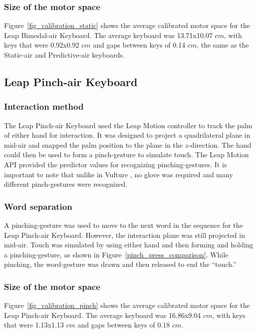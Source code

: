 \subsubsection{Size of the motor space}
Figure~\ref{fig_calibration_static} shows the average calibrated motor space for the Leap Bimodal-air Keyboard. The average keyboard was 13.71x10.07 $cm$, with keys that were 0.92x0.92 $cm$ and gaps between keys of 0.14 $cm$, the same as the Static-air and Predictive-air keyboards.

\subsection{Leap Pinch-air Keyboard}
\subsubsection{Interaction method}
The Leap Pinch-air Keyboard used the Leap Motion controller to track the palm of either hand for interaction. It was designed to project a quadrilateral plane in mid-air and snapped the palm position to the plane in the $z$-direction. The hand could then be used to form a pinch-gesture to simulate touch. The Leap Motion API provided the predictor values for recognizing pinching-gestures. It is important to note that unlike in Vulture \cite{ref_vulture}, no glove was required and many different pinch-gestures were recognized.

\subsubsection{Word separation}
A pinching-gesture was used to move to the next word in the sequence for the Leap Pinch-air Keyboard. However, the interaction plane was still projected in mid-air. Touch was simulated by using either hand and then forming and holding a pinching-gesture, as shown in Figure~\ref{pinch_press_comparison}. While pinching, the word-gesture was drawn and then released to end the ``touch.''

\subsubsection{Size of the motor space}
Figure~\ref{fig_calibration_pinch} shows the average calibrated motor space for the Leap Pinch-air Keyboard. The average keyboard was 16.86x9.04 $cm$, with keys that were 1.13x1.13 $cm$ and gaps between keys of 0.18 $cm$.

